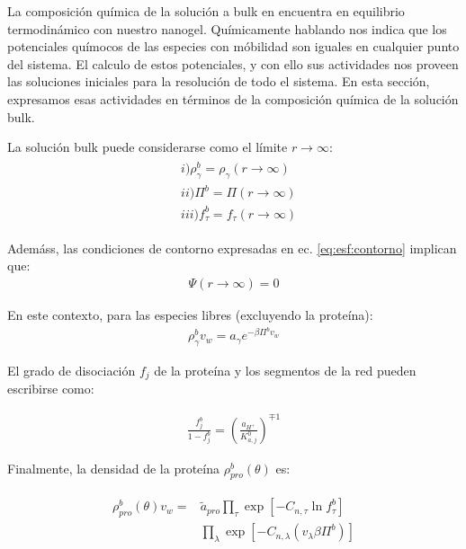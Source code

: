 La composici\'on qu\'imica de la soluci\'on a bulk en encuentra en equilibrio termodin\'amico con nuestro nanogel. Qu\'imicamente hablando nos indica que los potenciales qu\'imocos de las especies con m\'obilidad son iguales en cualquier punto del sistema. 
El calculo de estos potenciales, y con ello sus actividades nos proveen  las soluciones iniciales para la resoluci\'on de todo el sistema.
En esta secci\'on, expresamos esas actividades en t\'erminos de la composici\'on qu\'imica de la soluci\'on bulk.

La soluci\'on bulk  puede considerarse como el límite $r \rightarrow \infty$:
\begin{align}
	\begin{aligned}
		& i)\rho^b_\gamma =\rho_\gamma (r \rightarrow \infty) \\
		& ii) \Pi^b = \Pi(r \rightarrow \infty) \\
		& iii) f_\tau^b = f_\tau(r \rightarrow \infty)
	\end{aligned}
\end{align}

Adem\'ass, las condiciones de contorno expresadas en ec. \ref{eq:esf:contorno} implican que:
\begin{align}
	\Psi(r \rightarrow \infty) = 0
\end{align}

En este contexto, para las especies libres (excluyendo la prote\'ina):
\begin{align}
	\rho_\gamma^b v_w = a_\gamma e^{-\beta\Pi^bv_w}
	\label{eq:esf:free-bulk}
\end{align}

El grado de disociaci\'on $f_j$ de la prote\'ina y los segmentos de la red pueden escribirse como:

\begin{align}
	\frac{f_j^b}{1-f_j^b} = \left(\frac{a_{H^+}}{K^0_{a,j}}\right)^{\mp 1}
\end{align}

Finalmente, la densidad de la prote\'ina $\rho_{pro}^b(\theta)$ es:

\begin{align}
	\begin{aligned}
		\rho^b_{pro}(\theta)v_w = &\tilde{a}_{pro} \prod_\tau\exp\left[-C_{n,\tau} \ln f^b_\tau\right] \\
		&\prod_\lambda \exp \left[-C_{n,\lambda} (v_\lambda\beta\Pi^b ) \right]
	\end{aligned}
	\label{eq:esf:bulk-protein}
\end{align}

